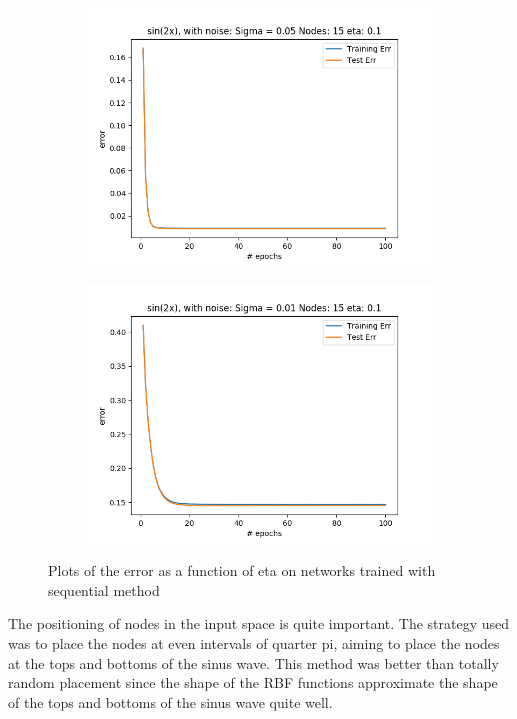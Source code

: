 \documentclass{article}
\begin{document}
\begin{figure}[ht!]
\begin{subfigure}[t]{0.4\textwidth}
        \includegraphics[width=1\textwidth]{plots/noise/seq_sin2x_15nodes_sigma1_error_per_epoch_eta005.png}
        \caption{}
    \end{subfigure}
    \begin{subfigure}[t]{0.4\textwidth}
        \centering
        \includegraphics[width=1\textwidth]{plots/noise/seq_sin2x_15nodes_sigma1_error_per_epoch_eta001.png}
        \caption{}
    \end{subfigure}
    \caption{Plots of the error as a function of eta on networks trained with sequential method}
\end{figure}

The positioning of nodes in the input space is quite important. The strategy used was to place the nodes at even intervals of quarter pi, aiming to place the nodes at the tops and bottoms of the sinus wave. This method was better than totally random placement since the shape of the RBF functions approximate the shape of the tops and bottoms of the sinus wave quite well. 
\end{document}
